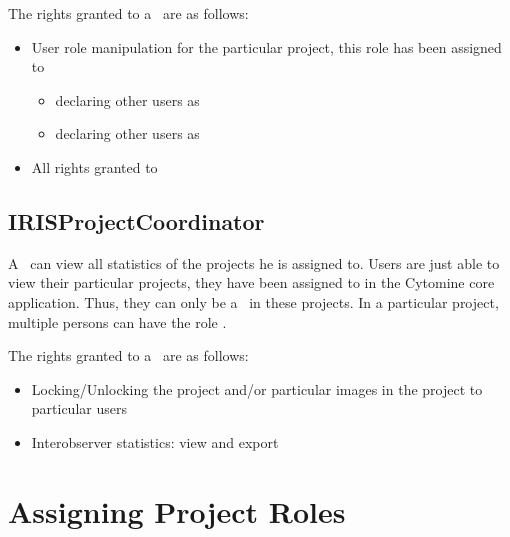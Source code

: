 The rights granted to a \pjadmin\ are as follows:
\begin{itemize}
\item User role manipulation for the particular project, this role has been assigned to
\begin{itemize}
\item declaring other users as \pjadmin
\item declaring other users as \pjcoord
\end{itemize}
\item All rights granted to \pjcoord
\end{itemize}



\subsection{IRISProjectCoordinator}
A \pjcoord\ can view all statistics of the projects he is assigned to. 
Users are just able to view their particular projects, they have been assigned to in the Cytomine core application.
Thus, they can only be a \pjcoord\ in these projects. 
In a particular project, multiple persons can have the role \pjcoord . 

The rights granted to a \pjcoord\ are as follows:
\begin{itemize}
\item Locking/Unlocking the project and/or particular images in the project to particular users
\item Interobserver statistics: view and export
\end{itemize}



\section{Assigning Project Roles}





%







